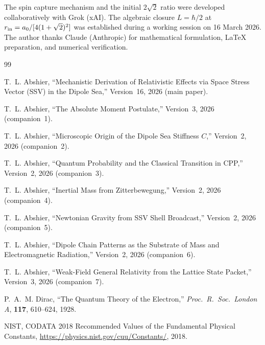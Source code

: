 \documentclass[12pt]{article}
\newcommand{\rin}{r_{\rm in}}
\newcommand{\aBohr}{a_0}
\begin{document}
The spin capture mechanism and the initial $2\sqrt{2}$ ratio were
developed collaboratively with Grok (xAI).  The algebraic closure
$L = \hbar/2$ at $\rin = \aBohr/[4(1+\sqrt{2})^2]$ was established
during a working session on 16 March 2026.  The author thanks Claude
(Anthropic) for mathematical formulation, LaTeX preparation, and
numerical verification.

\begin{thebibliography}{99}

T.~L. Abshier,
``Mechanistic Derivation of Relativistic Effects via Space Stress
Vector (SSV) in the Dipole Sea,''
Version~16, 2026 (main paper).

T.~L. Abshier,
``The Absolute Moment Postulate,''
Version~3, 2026 (companion~1).

T.~L. Abshier,
``Microscopic Origin of the Dipole Sea Stiffness $C$,''
Version~2, 2026 (companion~2).

T.~L. Abshier,
``Quantum Probability and the Classical Transition in CPP,''
Version~2, 2026 (companion~3).

T.~L. Abshier,
``Inertial Mass from Zitterbewegung,''
Version~2, 2026 (companion~4).

T.~L. Abshier,
``Newtonian Gravity from SSV Shell Broadcast,''
Version~2, 2026 (companion~5).

T.~L. Abshier,
``Dipole Chain Patterns as the Substrate of Mass and
Electromagnetic Radiation,''
Version~2, 2026 (companion~6).

T.~L. Abshier,
``Weak-Field General Relativity from the Lattice State Packet,''
Version~3, 2026 (companion~7).

P.~A.~M. Dirac,
``The Quantum Theory of the Electron,''
\textit{Proc.\ R.\ Soc.\ London A}, \textbf{117}, 610--624, 1928.

NIST, CODATA 2018 Recommended Values of the Fundamental Physical
Constants,
\url{https://physics.nist.gov/cuu/Constants/}, 2018.

\end{thebibliography}
\end{document}
